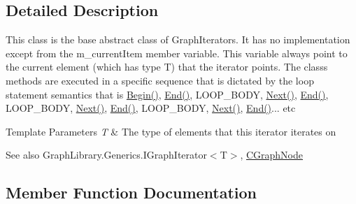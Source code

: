 \subsection{Detailed Description}
This class is the base abstract class of Graph\+Iterators. It has no implementation except from the m\+\_\+current\+Item member variable. This variable always point to the current element (which has type T) that the iterator points. The class\textquotesingle{}s methods are executed in a specific sequence that is dictated by the loop statement semantics that is \hyperlink{class_graph_library_1_1_generics_1_1_abstract_graph_iterator_a2c97c7a412c233b8442b7ad403f29779}{Begin()}, \hyperlink{class_graph_library_1_1_generics_1_1_abstract_graph_iterator_aa8cd9f596ec0b6c4c1e9c244ba75df04}{End()}, L\+O\+O\+P\+\_\+\+B\+O\+D\+Y, \hyperlink{class_graph_library_1_1_generics_1_1_abstract_graph_iterator_aac8cffd0d579708a94ba056e4f4a00b2}{Next()}, \hyperlink{class_graph_library_1_1_generics_1_1_abstract_graph_iterator_aa8cd9f596ec0b6c4c1e9c244ba75df04}{End()}, L\+O\+O\+P\+\_\+\+B\+O\+D\+Y, \hyperlink{class_graph_library_1_1_generics_1_1_abstract_graph_iterator_aac8cffd0d579708a94ba056e4f4a00b2}{Next()}, \hyperlink{class_graph_library_1_1_generics_1_1_abstract_graph_iterator_aa8cd9f596ec0b6c4c1e9c244ba75df04}{End()}, L\+O\+O\+P\+\_\+\+B\+O\+D\+Y, \hyperlink{class_graph_library_1_1_generics_1_1_abstract_graph_iterator_aac8cffd0d579708a94ba056e4f4a00b2}{Next()}, \hyperlink{class_graph_library_1_1_generics_1_1_abstract_graph_iterator_aa8cd9f596ec0b6c4c1e9c244ba75df04}{End()}... etc 


\begin{DoxyTemplParams}{Template Parameters}
{\em T} & The type of elements that this iterator iterates on\\
\hline
\end{DoxyTemplParams}
\begin{DoxySeeAlso}{See also}
Graph\+Library.\+Generics.\+I\+Graph\+Iterator$<$\+T$>$, \hyperlink{class_graph_library_1_1_c_graph_node}{C\+Graph\+Node}


\end{DoxySeeAlso}


\subsection{Member Function Documentation}
\hypertarget{class_graph_library_1_1_generics_1_1_abstract_graph_iterator_a2c97c7a412c233b8442b7ad403f29779}{}

